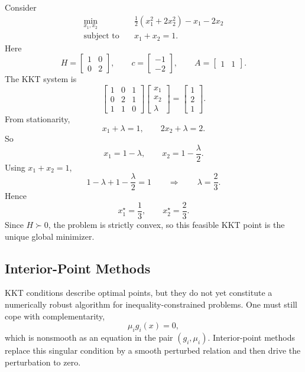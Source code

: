 \begin{eg}
	Consider
	\begin{align*}
		\min_{x_1,x_2}\quad & \frac{1}{2}(x_1^2+2x_2^2)-x_1-2x_2 \\
		\text{subject to}\quad & x_1+x_2=1.
	\end{align*}
	Here
	\[
		H=
		\begin{bmatrix}
			1 & 0 \\
			0 & 2
		\end{bmatrix},
		\qquad
		c=
		\begin{bmatrix}
			-1 \\
			-2
		\end{bmatrix},
		\qquad
		A=
		\begin{bmatrix}
			1 & 1
		\end{bmatrix}.
	\]
	The KKT system is
	\[
		\begin{bmatrix}
			1 & 0 & 1 \\
			0 & 2 & 1 \\
			1 & 1 & 0
		\end{bmatrix}
		\begin{bmatrix}
			x_1 \\
			x_2 \\
			\lambda
		\end{bmatrix}
		=
		\begin{bmatrix}
			1 \\
			2 \\
			1
		\end{bmatrix}.
	\]
	From stationarity,
	\[
		x_1+\lambda=1,
		\qquad
		2x_2+\lambda=2.
	\]
	So
	\[
		x_1=1-\lambda,
		\qquad
		x_2=1-\frac{\lambda}{2}.
	\]
	Using $x_1+x_2=1$,
	\[
		1-\lambda + 1-\frac{\lambda}{2}=1
		\qquad \Longrightarrow \qquad
		\lambda=\frac{2}{3}.
	\]
	Hence
	\[
		x_1^\star=\frac{1}{3},
		\qquad
		x_2^\star=\frac{2}{3}.
	\]
	Since $H\succ 0$, the problem is strictly convex, so this feasible KKT point is the unique global minimizer.
\end{eg}

\subsection{Interior-Point Methods}
\label{sec:l3-interior-point-methods}

\begin{remark}
	KKT conditions describe optimal points, but they do not yet constitute a numerically robust algorithm for inequality-constrained problems. One must still cope with complementarity,
	\[
		\mu_i g_i(x)=0,
	\]
	which is nonsmooth as an equation in the pair $(g_i,\mu_i)$. Interior-point methods replace this singular condition by a smooth perturbed relation and then drive the perturbation to zero.
\end{remark}

